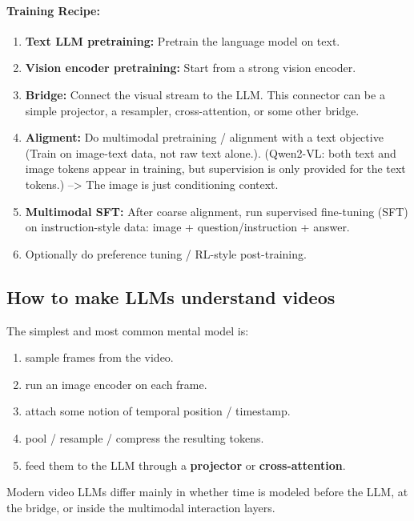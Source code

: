 \documentclass[11pt]{article}  %
\begin{document}
\paragraph{Training Recipe:}
\begin{enumerate}
  \item \textbf{Text LLM pretraining:} Pretrain the language model on text.
  \item \textbf{Vision encoder pretraining:} Start from a strong vision encoder.
  \item \textbf{Bridge:} Connect the visual stream to the LLM. This connector can be a simple projector, a resampler, cross-attention, or some other bridge.
  \item \textbf{Aligment:} Do multimodal pretraining / alignment with a text objective (Train on image-text data, not raw text alone.). (Qwen2-VL: both text and image tokens appear in training, but supervision is only provided for the text tokens.) --> The image is just conditioning context.
  \item \textbf{Multimodal SFT:} After coarse alignment, run supervised fine-tuning (SFT) on instruction-style data: image + question/instruction + answer.
  \item Optionally do preference tuning / RL-style post-training.
\end{enumerate}


\subsection{How to make LLMs understand videos}
The simplest and most common mental model is: 
\begin{enumerate}
  \item sample frames from the video.
  \item run an image encoder on each frame.
  \item attach some notion of temporal position / timestamp.
  \item pool / resample / compress the resulting tokens.
  \item feed them to the LLM through a \textbf{projector} or \textbf{cross-attention}.
\end{enumerate}

Modern video LLMs differ mainly in whether time is modeled before the LLM, at the bridge, or inside the multimodal interaction layers.
\end{document}
